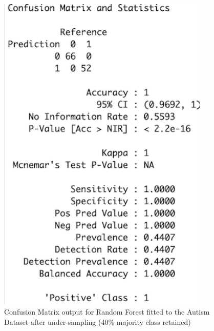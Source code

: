 \begin{figure}[!htbp]
    \centering
    \begin{minipage}{0.45\textwidth}
        \centering
        \includegraphics[width=0.9\textwidth]{ThesisTemplate/appendix/images/Chapter5Appendix/ConfusionMatrix40/Autism.png}
        \caption{Confusion Matrix output for Random Forest fitted to the Autism Dataset after under-sampling (40\% majority class retained)}
        \label{fig:matrixAutism40}
    \end{minipage}\hfill
    \begin{minipage}{0.45\textwidth}
        \centering

\end{minipage}
\end{figure}
